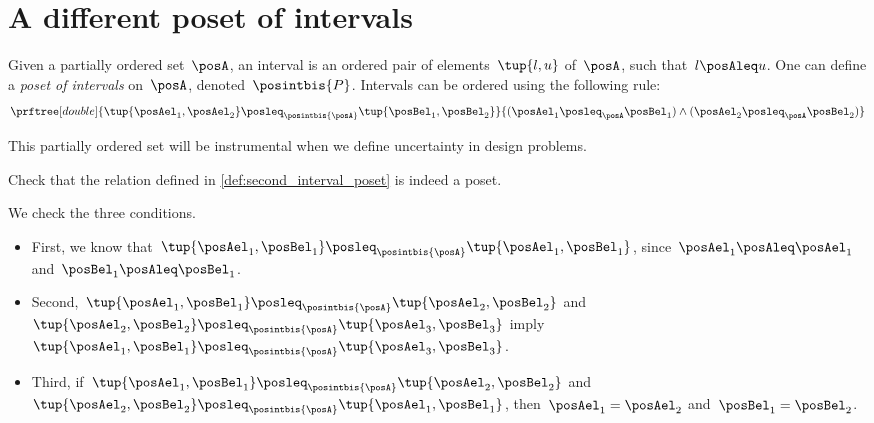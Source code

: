 \section{A different poset of intervals}
\begin{definition}
\label{def:second_interval_poset}
Given a partially ordered set~$\posA$, an interval is an ordered pair of elements~$\tup{l,u}$ of~$\posA$, such that~$l\posAleq u$.
One can define a \emph{poset of intervals} on~$\posA$, denoted~$\posintbis{P}$. Intervals can be ordered using the following rule:
\begin{equation}
    \prftree[double]{\tup{\posAel_1,\posAel_2}\posleq_{\posintbis{\posA}}\tup{\posBel_1,\posBel_2}}{(\posAel_1\posleq_\posA \posBel_1) \wedge (\posAel_2\posleq_\posA \posBel_2)}
\end{equation}
\end{definition}

This partially ordered set will be instrumental when we define uncertainty in design problems.

\begin{exercise}
    Check that the relation defined in \cref{def:second_interval_poset} is indeed a poset.
\end{exercise}
\begin{solution}
We check the three conditions.
    \begin{itemize}
    \item First, we know that~$\tup{\posAel_1,\posBel_1}\posleq_{\posintbis{\posA}}\tup{\posAel_1,\posBel_1}$, since~$\posAel_1\posAleq \posAel_1$ and~$\posBel_1\posAleq \posBel_1$.
    \item Second,~$\tup{\posAel_1,\posBel_1}\posleq_{\posintbis{\posA}}\tup{\posAel_2,\posBel_2}$ and~$\tup{\posAel_2,\posBel_2}\posleq_{\posintbis{\posA}}\tup{\posAel_3,\posBel_3}$ imply~$\tup{\posAel_1,\posBel_1}\posleq_{\posintbis{\posA}}\tup{\posAel_3,\posBel_3}$.
    \item Third, if~$\tup{\posAel_1,\posBel_1}\posleq_{\posintbis{\posA}}\tup{\posAel_2,\posBel_2}$ and~$\tup{\posAel_2,\posBel_2}\posleq_{\posintbis{\posA}}\tup{\posAel_1,\posBel_1}$, then~$\posAel_1=\posAel_2$ and~$\posBel_1=\posBel_2$.
    \end{itemize}
    \end{solution}
